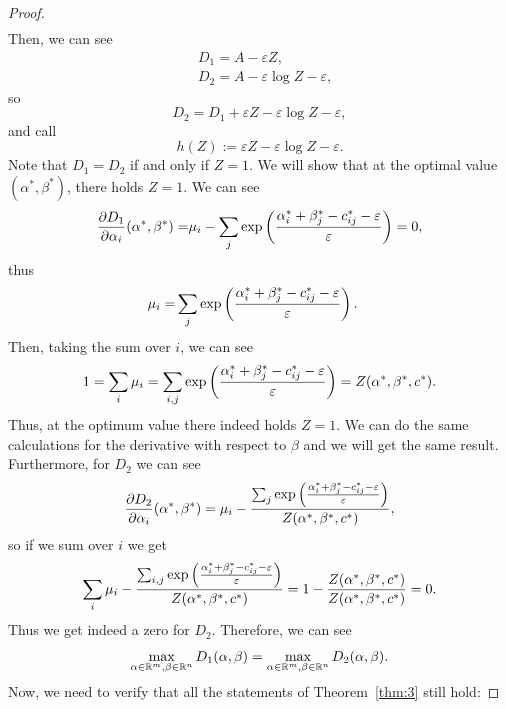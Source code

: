 \begin{proof}
\begin{align*}
	\end{align*}
	Then, we can see 
	\begin{align*}
		&D_1 = A - \varepsilon Z,\\ &D_2 = A - \varepsilon \log Z - \varepsilon, 
	\end{align*}
	so 
	\[D_2 = D_1 + \varepsilon Z - \varepsilon \log Z - \varepsilon,\]
	and call 
	\[h(Z) := \varepsilon Z - \varepsilon \log Z - \varepsilon. \]
	Note that $D_1 = D_2$ if and only if $Z = 1$. We will show that at the optimal value $(\alpha^*, \beta^*)$, there holds $Z=1$. We can see 
	\begin{align*}
		\frac{\partial D_1}{\partial \alpha_i}(\alpha^*, \beta^*) = & \mu_i - \sum_j \exp \left(\frac{\alpha_i^* + \beta_j^* - c_{ij}^* - \varepsilon }{\varepsilon}\right) = 0, \\
	\end{align*}
	thus 
	\begin{align*}
		\mu_i = & \sum_j \exp \left(\frac{\alpha_i^* + \beta_j^* - c_{ij}^* - \varepsilon }{\varepsilon}\right). 
	\end{align*}
	Then, taking the sum over $i$, we can see 
	\begin{equation*}
		1 = \sum_i \mu_i = \sum_{i,j} \exp \left(\frac{\alpha_i^* + \beta_j^* - c_{ij}^* - \varepsilon }{\varepsilon}\right) = Z(\alpha^*, \beta^*, c^*).
	\end{equation*}
	Thus, at the optimum value there indeed holds $Z = 1$. We can do the same calculations for the derivative with respect to $\beta$ and we will get the same result.	Furthermore, for $D_2$ we can see 
	\begin{equation*}
		\frac{\partial D_2}{\partial \alpha_i}(\alpha^*, \beta^*) = \mu_i - \frac{\sum_j \exp \left(\frac{\alpha_i^* + \beta_j^* - c_{ij}^* - \varepsilon }{\varepsilon}\right)}{Z(\alpha^*, \beta^*, c^*)} ,
	\end{equation*}
	so if we sum over $i$ we get 
	\begin{equation*}
		\sum_i \mu_i - \frac{\sum_{i,j} \exp \left(\frac{\alpha_i^* + \beta_j^* - c_{ij}^* - \varepsilon }{\varepsilon}\right)}{Z(\alpha^*, \beta^*, c^*)} = 1 - \frac{Z(\alpha^*, \beta^*, c^*)}{Z(\alpha^*, \beta^*, c^*)} = 0.
	\end{equation*}
	Thus we get indeed a zero for $D_2$. Therefore, we can see 
	\begin{equation*}
		\max_{\alpha \in \mathbb{R}^m, \beta\in \mathbb{R}^n} D_1 (\alpha, \beta) = \max_{\alpha \in \mathbb{R}^m, \beta\in \mathbb{R}^n} D_2(\alpha, \beta). 
	\end{equation*}
	Now, we need to verify that all the statements of Theorem~\ref{thm:3} still hold:\par 

\end{proof}

